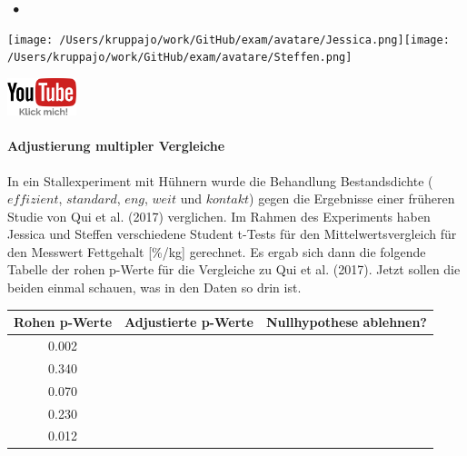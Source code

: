 \documentclass[a4paper, 9pt]{scrartcl}\usepackage[]{graphicx}\usepackage[]{xcolor}
\newenvironment{knitrout}{}{} %
\begin{document}
 
\ifcollection
\begin{flushright}
\tiny\vspace{-3Ex}
\textbf{\examinhaltstart}
\exammodulestatversuch $\;\bullet$
\exammodulebiostat
\vspace{-4Ex}
\end{flushright}
\begin{minipage}[t]{0.5\textwidth}
\texttt{[image: /Users/kruppajo/work/GitHub/exam/avatare/Jessica.png]}\hspace{-4mm}\texttt{[image: /Users/kruppajo/work/GitHub/exam/avatare/Steffen.png]}
\end{minipage}
\begin{minipage}[t]{0.5\textwidth}
\hfill
\href{https://youtu.be/kHmfEmU6lrk}{\includegraphics[width = 2cm]{img/youtube}}
\end{minipage}
\fi



\ifcollection
\paragraph{Adjustierung multipler Vergleiche}
\fi

In ein Stallexperiment mit Hühnern wurde die Behandlung Bestandsdichte ($effizient$, $standard$, $eng$, $weit$ und $kontakt$) gegen die Ergebnisse einer früheren Studie von Qui et al. (2017) verglichen. Im Rahmen des Experiments haben Jessica und Steffen verschiedene Student t-Tests für den Mittelwertsvergleich für den Messwert Fettgehalt [\%/kg] gerechnet. Es ergab sich dann die folgende Tabelle der rohen p-Werte für die Vergleiche zu Qui et al. (2017). Jetzt sollen die beiden einmal schauen, was in den Daten so drin ist.

\begin{knitrout}
\color{fgcolor}\begin{table}[!h]
\centering\begingroup\fontsize{10}{12}\selectfont

\begin{tabular}{ccc}
\toprule
\textbf{Rohen p-Werte} & \textbf{Adjustierte p-Werte} & \textbf{Nullhypothese ablehnen?}\\
\midrule
0.002 &  & \\
0.340 &  & \\
0.070 &  & \\
0.230 &  & \\
0.012 &  & \\
\bottomrule
\end{tabular}
\endgroup{}
\end{table}

\end{knitrout}
\end{document}
